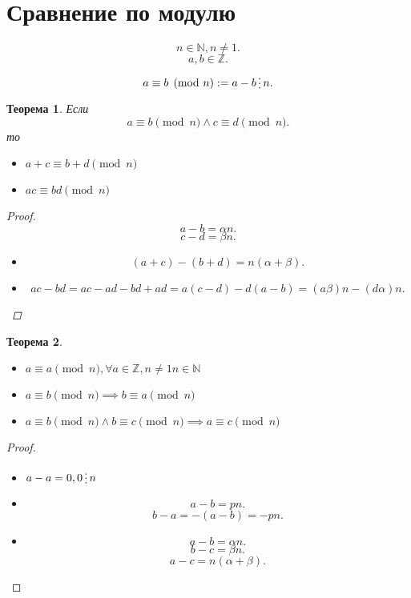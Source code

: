 \documentclass{scrarticle}
\newtheorem{theorem}{Теорема}
\newcommand{\divisible}{\mathop{\raisebox{-2pt}{\vdots}}}
\begin{document}
    \section{Сравнение по модулю}
    \[
    n \in \mathbb{N}, n \neq 1
    .\] 
    \[
    a , b \in \mathbb{Z}
    .\] 
    \[
        a \equiv b \pmod{n} := a - b \divisible n
    .\] 
    \begin{theorem}
        Если
        \[
            a \equiv b \pmod{n} \land c \equiv d \pmod{n}
        .\] 
        то
        \begin{itemize}
            \item $a + c \equiv b + d \pmod{n}$
            \item  $ac \equiv bd \pmod{n}$
        \end{itemize}
    \begin{proof}
            \[
            a - b = \alpha n
            .\] 
            \[
            c - d = \beta n
            .\] 
        \begin{itemize}
            \item
            \[
                (a + c) - (b + d) = n(\alpha + \beta)
            .\] 
            \item
                \[
                    ac - bd = ac - ad - bd + ad = a(c - d) - d (a - b) = (a\beta)n - (d \alpha)n
                .\] 
        \end{itemize}
    \end{proof}
    \end{theorem}
    \begin{theorem}
        \begin{itemize}
            \item $a \equiv a \pmod{n} , \forall  a\in \mathbb{Z}, n\neq 1 n \in \mathbb{N}$
            \item $a \equiv b \pmod{n} \implies b \equiv a \pmod{n}$
            \item $a \equiv b \pmod{n} \land b \equiv c \pmod{n} \implies a \equiv c \pmod{n}$
        \end{itemize}
    \end{theorem}
        \begin{proof}
            \begin{itemize}
                \item 
                    $a - a = 0 , 0 \divisible n$ 
                \item 
                    \[
                    a - b = pn
                    .\] 
                    \[
                    b - a = -(a - b) = -pn
                    .\] 
                \item
                    \[
                    a - b = \alpha n
                    .\] 
                    \[
                    b - c = \beta n
                    .\] 
                    \[
                    a - c = n(\alpha + \beta)
                    .\] 
            \end{itemize}
        \end{proof}
\end{document}

